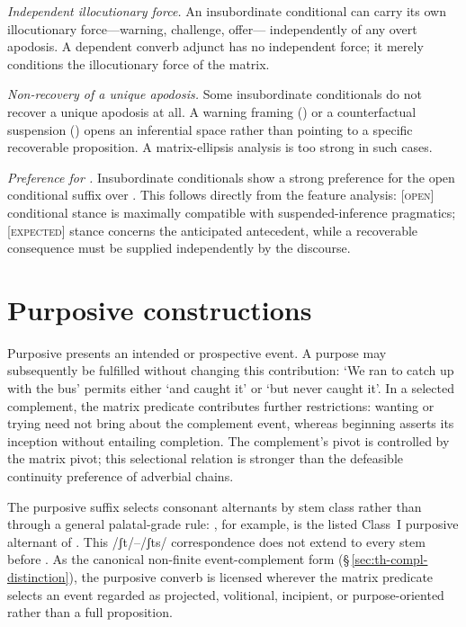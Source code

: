 \textit{Independent illocutionary force.} An insubordinate conditional can carry
its own illocutionary force---warning, challenge, offer--- independently of any
overt apodosis. A dependent converb adjunct has no independent force; it merely
conditions the illocutionary force of the matrix.

\textit{Non-recovery of a unique apodosis.} Some insubordinate conditionals do
not recover a unique apodosis at all. A warning framing () or a counterfactual suspension () opens an
inferential space rather than pointing to a specific recoverable proposition. A
matrix-ellipsis analysis is too strong in such cases.

\textit{Preference for .} Insubordinate conditionals show a strong
preference for the open conditional suffix over . This follows
directly from the feature analysis: [\textsc{open}] conditional stance is
maximally compatible with suspended-inference pragmatics; [\textsc{expected}]
stance concerns the anticipated antecedent, while a recoverable consequence
must be supplied independently by the discourse.

\section{Purposive constructions}\label{sec:purposive}

Purposive  presents an intended or prospective event. A purpose may
subsequently be fulfilled without changing this contribution: `We ran to catch
up with the bus' permits either `and caught it' or `but never caught it'. In a
selected complement, the matrix predicate contributes further restrictions:
wanting or trying need not bring about the complement event, whereas beginning
asserts its inception without entailing completion. The complement's pivot is
controlled by the matrix pivot; this selectional relation is stronger than the
defeasible continuity preference of adverbial chains.

The purposive suffix selects consonant alternants by stem class rather than
through a general palatal-grade rule: , for example, is the listed Class~I
purposive alternant of . This /ʃt/--/ʃts/ correspondence does not
extend to every stem before . As the canonical non-finite
event-complement form (§\,\ref{sec:th-compl-distinction}), the purposive converb
is licensed wherever the matrix predicate selects an event regarded as
projected, volitional, incipient, or purpose-oriented rather than a full
proposition.

